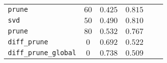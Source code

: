 \begin{table}[tbh]
\begin{tabular}{lccccc}
\texttt{prune}               &      $60$\textsuperscript{} &   $0.425$\textsuperscript{} &   $0.815$\textsuperscript{} \\
\texttt{svd}                 &      $50$\textsuperscript{} &   $0.490$\textsuperscript{} &   $0.810$\textsuperscript{} \\
\texttt{prune}               &      $80$\textsuperscript{} &   $0.532$\textsuperscript{} &   $0.767$\textsuperscript{} \\
\texttt{diff\_prune}         &       $0$\textsuperscript{} &   $0.692$\textsuperscript{} &   $0.522$\textsuperscript{} \\
\texttt{diff\_prune\_global} &       $0$\textsuperscript{} &   $0.738$\textsuperscript{} &   $0.509$\textsuperscript{} \\
\bottomrule
\end{tabular}

        \end{table}